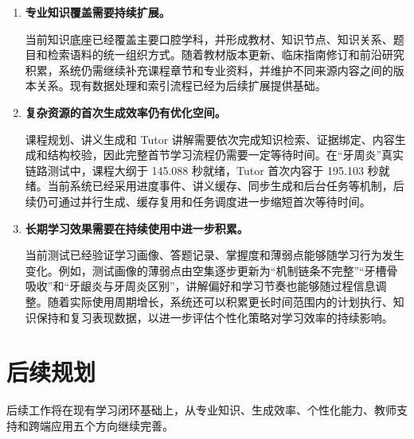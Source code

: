 \begin{enumerate}
  \item \textbf{专业知识覆盖需要持续扩展。}

  当前知识底座已经覆盖主要口腔学科，并形成教材、知识节点、知识关系、题目和检索语料的统一组织方式。随着教材版本更新、临床指南修订和前沿研究积累，系统仍需继续补充课程章节和专业资料，并维护不同来源内容之间的版本关系。现有数据处理和索引流程已经为后续扩展提供基础。

  \item \textbf{复杂资源的首次生成效率仍有优化空间。}

  课程规划、讲义生成和 Tutor 讲解需要依次完成知识检索、证据绑定、内容生成和结构校验，因此完整首节学习流程仍需要一定等待时间。在“牙周炎”真实链路测试中，课程大纲于 145.088 秒就绪，Tutor 首次内容于 195.103 秒就绪。当前系统已经采用进度事件、讲义缓存、同步生成和后台任务等机制，后续仍可通过并行生成、缓存复用和任务调度进一步缩短首次等待时间。

  \item \textbf{长期学习效果需要在持续使用中进一步积累。}

  当前测试已经验证学习画像、答题记录、掌握度和薄弱点能够随学习行为发生变化。例如，测试画像的薄弱点由空集逐步更新为“机制链条不完整”“牙槽骨吸收”和“牙龈炎与牙周炎区别”，讲解偏好和学习节奏也能够随过程信息调整。随着实际使用周期增长，系统还可以积累更长时间范围内的计划执行、知识保持和复习表现数据，以进一步评估个性化策略对学习效率的持续影响。
\end{enumerate}

\section{后续规划}

后续工作将在现有学习闭环基础上，从专业知识、生成效率、个性化能力、教师支持和跨端应用五个方向继续完善。

